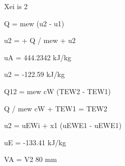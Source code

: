 Xei is 2

Q = mew (u2 - u1)

u2 = + Q / mew + u2

uA = 444.2342 kJ/kg

u2 = -122.59 kJ/kg

Q12 = mew cW (TEW2 - TEW1)

Q / mew cW + TEW1 = TEW2

u2 = uEWi + x1 (uEWE1 - uEWE1)

uE = -133.41 kJ/kg

VA = V2 80 mm